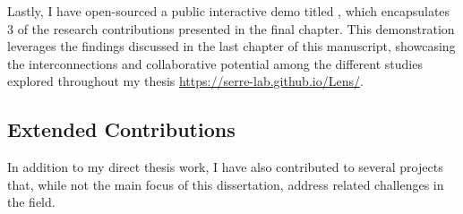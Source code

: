 Lastly, I have open-sourced a public interactive demo titled \Lens, which encapsulates 3 of the research contributions presented in the final chapter. This demonstration leverages the findings discussed in the last chapter of this manuscript, showcasing the interconnections and collaborative potential among the different studies explored throughout my thesis \url{https://serre-lab.github.io/Lens/}.


\subsection{Extended Contributions}

In addition to my direct thesis work, I have also contributed to several projects that, while not the main focus of this dissertation, address related challenges in the field.

